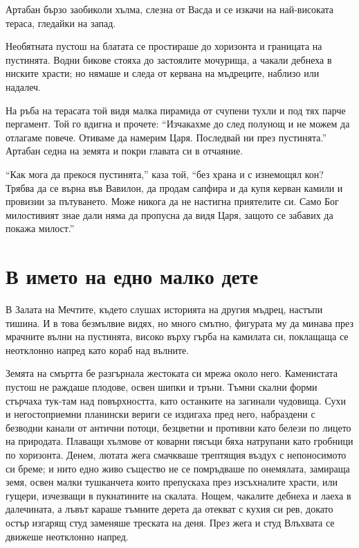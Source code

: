 \documentclass[oneside,10pt]{memoir}
\begin{document}
Артабан бързо заобиколи хълма, слезна от Васда и се изкачи на най-високата
тераса, гледайки на запад.

Необятната пустош на блатата се простираше до хоризонта и границата на
пустинята. Водни бикове стояха до застоялите мочурища, а чакали дебнеха в
ниските храсти; но нямаше и следа от кервана на мъдреците, наблизо или надалеч.

На ръба на терасата той видя малка пирамида от счупени тухли и под тях парче
пергамент. Той го вдигна и прочете: ``Изчакахме до след полунощ и не можем да
отлагаме повече. Отиваме да намерим Царя. Последвай ни през пустинята.'' Артабан
седна на земята и покри главата си в отчаяние.

``Как мога да прекося пустинята,'' каза той, ``без храна и с изнемощял кон?
Трябва да се върна във Вавилон, да продам сапфира и да купя керван камили и
провизии за пътуването. Може никога да не настигна приятелите си. Само Бог
милостивият знае дали няма да пропусна да видя Царя, защото се забавих да покажа
милост.''

\part{В името на едно малко дете}

В Залата на Мечтите, където слушах историята на другия мъдрец, настъпи тишина. И
в това безмълвие видях, но много смътно, фигурата му да минава през мрачните
вълни на пустинята, високо върху гърба на камилата си, поклащаща се неотклонно
напред като кораб над вълните.

Земята на смъртта бе разгърнала жестоката си мрежа около него. Каменистата
пустош не раждаше плодове, освен шипки и тръни. Тъмни скални форми стърчаха
тук-там над повърхността, като останките на загинали чудовища. Сухи и
негостоприемни планински вериги се издигаха пред него, набраздени с безводни
канали от антични потоци, безцветни и противни като белези по лицето на
природата. Плаващи хълмове от коварни пясъци бяха натрупани като гробници по
хоризонта. Денем, лютата жега смачкваше трептящия въздух с непоносимото си
бреме; и нито едно живо същество не се помръдваше по онемялата, замираща земя,
освен малки тушканчета които препускаха през изсъхналите храсти, или гущери,
изчезващи в пукнатините на скалата. Нощем, чакалите дебнеха и лаеха в
далечината, а лъвът караше тъмните дерета да отекват с кухия си рев, докато
остър изгарящ студ заменяше треската на деня. През жега и студ Влъхвата се
движеше неотклонно напред.
\end{document}
